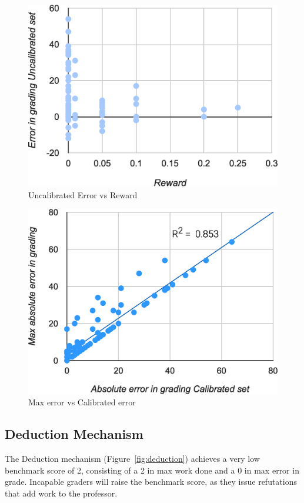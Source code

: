 \documentclass{sigchi}
\begin{document}
\begin{figure}[!h]
\centering
\includegraphics[width=0.9\columnwidth]{Reward-Error-Graph.eps}
\caption{Uncalibrated Error vs Reward}
\label{fig:reward-error}
\end{figure}

\begin{figure}[!h]
\centering
\includegraphics[width=0.9\columnwidth]{Error-Calibration-Graph.eps}
\caption{Max error vs Calibrated error}
\label{fig:error-calibration}
\end{figure}

\subsection{Deduction Mechanism}

The Deduction mechanism (Figure~\ref{fig:deduction}) achieves a very low benchmark score of 2, consisting of a 2 in max work done and a 0 in max error in grade. Incapable graders will raise the benchmark score, as they issue refutations that add work to the professor.
\end{document}
